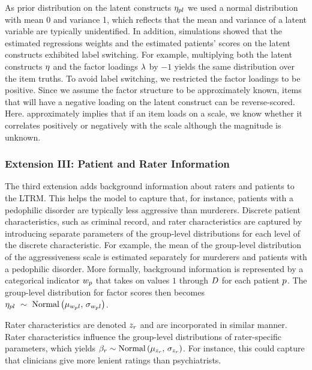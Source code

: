 \documentclass[a4paper,usenames,dvipsnames]{article}
\newenvironment{revision}{\color{teal}}{\color{black}}
\begin{document}
As prior distribution on the latent constructs $\eta_{pl}$ we used a normal distribution with mean 0 and variance 1, which reflects that the mean and variance of a latent variable are typically  unidentified. In addition, simulations showed that the estimated regressions weights and the estimated patients' scores on the latent constructs exhibited label switching. For example, multiplying both the latent constructs $\eta$ and the factor loadings $\lambda$ by $-1$ yields the same distribution over the item truths. To avoid label switching, we restricted the factor loadings to be positive. Since we assume the factor structure to be approximately known, items that will have a negative loading on the latent construct can \begin{revision}be\end{revision} reverse-scored. Here. approximately implies that if an item loads on a scale, we know whether it correlates positively or negatively with the scale although the magnitude is unknown.

\subsubsection*{Extension III: Patient and Rater Information}
The third extension adds background information about raters and patients to the LTRM. This helps the model to capture that, for instance, patients with a pedophilic disorder are typically less aggressive than murderers. Discrete patient characteristics, such as criminal record,  and rater characteristics are captured by introducing separate parameters of the group-level distributions for each level of the discrete characteristic. For example, the mean of the group-level distribution of the aggressiveness scale is estimated separately for murderers and patients with a pedophilic disorder. More formally, background information is represented by a categorical indicator $w_{p}$ that takes on values $1$ through $\TdiscreteP$ for each patient $p$. The group-level distribution for factor scores then becomes $\eta_{pl}~\sim~\text{Normal}\left(\mu_{w_pl},\,\sigma_{w_pl}\right)$.

 Rater characteristics are denoted $z_r$ and are incorporated in similar manner. Rater characteristics influence the group-level distributions of rater-specific parameters, which yields $\beta_r \sim \text{Normal}\left(\mu_{z_r},\,\sigma_{z_r}\right)$. For instance, this could capture that clinicians give more lenient ratings than psychiatrists.
\end{document}
